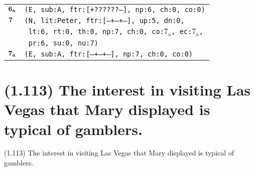 \documentclass{article}
\begin{document}
\begin{minipage}{\textwidth}
{\begin{tabular}{|r|l|}
    ${\textbf{\textrm{6}}_{\textbf{\textrm{a}}}}$ & \texttt{\texttt{(E,~sub:A,~ftr:[+??????--],~np:6,~ch:0,~co:0)}} \\
    ${\textbf{\textrm{7}}_{\phantom{z}}}$ & \texttt{\texttt{(N,~lit:Peter,~ftr:[---+--+--],~up:5,~dn:0,}} \\
    & \texttt{\texttt{~lt:6,~rt:0,~th:0,~np:7,~ch:0,~co:${\textrm{7}_{\textrm{a}}}$,~ec:${\textrm{7}_{\textrm{a}}}$,}} \\
    & \texttt{\texttt{~pr:6,~su:0,~nu:7)}} \\
    ${\textbf{\textrm{7}}_{\textbf{\textrm{a}}}}$ & \texttt{\texttt{(E,~sub:A,~ftr:[---+--+--],~np:7,~ch:0,~co:0)}} \\
    \hline
  \end{tabular}
  }
\end{minipage}
\bigbreak

\clearpage

%
%

\section*{(1.113) The interest in visiting Las Vegas that Mary displayed is typical of gamblers.}

\bigbreak
\begin{enumerate*}
\item[(1.113)] The interest in visiting Las Vegas that Mary displayed is typical of gamblers.
\end{enumerate*}
\bigbreak
\end{document}
